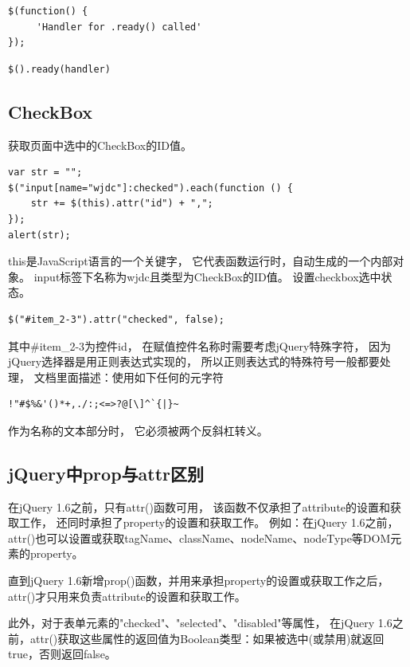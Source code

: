 \documentclass{book}
\begin{document}
\begin{lstlisting}[language=VBScript]
$(function() {  
     'Handler for .ready() called'  
}); 
\end{lstlisting}

\begin{lstlisting}[language=VBScript]
$().ready(handler)
\end{lstlisting}


\subsection{CheckBox}

获取页面中选中的CheckBox的ID值。

\begin{lstlisting}[language=VBScript]
var str = "";
$("input[name="wjdc"]:checked").each(function () {
    str += $(this).attr("id") + ",";
});
alert(str);
\end{lstlisting}

this是JavaScript语言的一个关键字，
它代表函数运行时，自动生成的一个内部对象。
input标签下名称为wjdc且类型为CheckBox的ID值。
设置checkbox选中状态。

\begin{lstlisting}[language=VBScript]
$("#item_2-3").attr("checked", false);
\end{lstlisting}

其中\#item\_2-3为控件id，
在赋值控件名称时需要考虑jQuery特殊字符，
因为jQuery选择器是用正则表达式实现的，
所以正则表达式的特殊符号一般都要处理，
文档里面描述：使用如下任何的元字符

\begin{lstlisting}
!"#$%&'()*+,./:;<=>?@[\]^`{|}~
\end{lstlisting}

作为名称的文本部分时， 
它必须被两个反斜杠转义。

\subsection{jQuery中prop与attr区别}

在jQuery 1.6之前，只有attr()函数可用，
该函数不仅承担了attribute的设置和获取工作，
还同时承担了property的设置和获取工作。
例如：在jQuery 1.6之前，attr()也可以设置或获取tagName、className、nodeName、nodeType等DOM元素的property。

直到jQuery 1.6新增prop()函数，并用来承担property的设置或获取工作之后，
attr()才只用来负责attribute的设置和获取工作。

此外，对于表单元素的"checked"、"selected"、"disabled"等属性，
在jQuery 1.6之前，attr()获取这些属性的返回值为Boolean类型：如果被选中(或禁用)就返回true，否则返回false。
\end{document}
